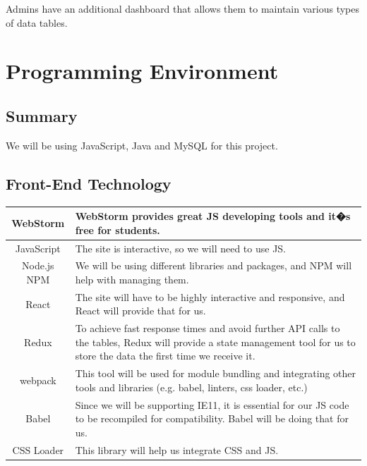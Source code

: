 \documentclass[11pt, titlepage]{article}
\begin{document}
Admins have an additional dashboard that allows them to maintain various types of data tables. 

\section{Programming Environment}

\subsection{Summary}

We will be using JavaScript, Java and MySQL for this project.

\subsection{Front-End Technology}

\begin{center}
        \begin{table}[!htbp]
        \centering
        \begin{tabularx}{\linewidth}{|| c | L ||}
    \hline
    WebStorm & WebStorm provides great JS developing tools and it�s free for students. \\
    \hline
    JavaScript & The site is interactive, so we will need to use JS. \\
    \hline
    Node.js NPM & We will be using different libraries and packages, and NPM will help with managing them.\\
    \hline
    React & The site will have to be highly interactive and responsive, and React will provide that for us. \\
    \hline
    Redux & To achieve fast response times and avoid further API calls to the tables, Redux will provide a state management tool for us to store the data the first time we receive it. \\
    \hline
    webpack & This tool will be used for module bundling and integrating other tools and libraries (e.g. babel, linters, css loader, etc.) \\
    \hline
    Babel & Since we will be supporting IE11, it is essential for our JS code to be recompiled for compatibility. Babel will be doing that for us. \\
    \hline
    CSS Loader & This library will help us integrate CSS and JS. \\
    \hline
    \end{tabularx}
    \end{table}
\end{center}
\end{document}
